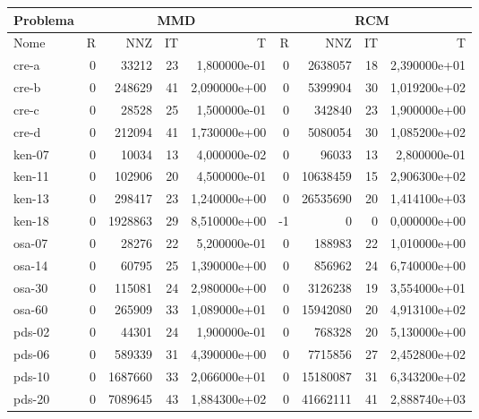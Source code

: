 \begin{tabular}{|l|r|r|r|r|r|r|r|r|}
\hline
\multicolumn{1}{|c|}{Problema} & \multicolumn{4}{|c|}{MMD} &         \multicolumn{4}{|c|}{RCM} \\ \hline
Nome & R & NNZ & IT & T & R & NNZ & IT & T \\ \hline
cre-a & 0 & 33212 & 23 & 1,800000e-01 & 0 & 2638057 & 18 & 2,390000e+01 \\ \hline
cre-b & 0 & 248629 & 41 & 2,090000e+00 & 0 & 5399904 & 30 & 1,019200e+02 \\ \hline
cre-c & 0 & 28528 & 25 & 1,500000e-01 & 0 & 342840 & 23 & 1,900000e+00 \\ \hline
cre-d & 0 & 212094 & 41 & 1,730000e+00 & 0 & 5080054 & 30 & 1,085200e+02 \\ \hline
ken-07 & 0 & 10034 & 13 & 4,000000e-02 & 0 & 96033 & 13 & 2,800000e-01 \\ \hline
ken-11 & 0 & 102906 & 20 & 4,500000e-01 & 0 & 10638459 & 15 & 2,906300e+02 \\ \hline
ken-13 & 0 & 298417 & 23 & 1,240000e+00 & 0 & 26535690 & 20 & 1,414100e+03 \\ \hline
ken-18 & 0 & 1928863 & 29 & 8,510000e+00 & -1 & 0 & 0 & 0,000000e+00 \\ \hline
osa-07 & 0 & 28276 & 22 & 5,200000e-01 & 0 & 188983 & 22 & 1,010000e+00 \\ \hline
osa-14 & 0 & 60795 & 25 & 1,390000e+00 & 0 & 856962 & 24 & 6,740000e+00 \\ \hline
osa-30 & 0 & 115081 & 24 & 2,980000e+00 & 0 & 3126238 & 19 & 3,554000e+01 \\ \hline
osa-60 & 0 & 265909 & 33 & 1,089000e+01 & 0 & 15942080 & 20 & 4,913100e+02 \\ \hline
pds-02 & 0 & 44301 & 24 & 1,900000e-01 & 0 & 768328 & 20 & 5,130000e+00 \\ \hline
pds-06 & 0 & 589339 & 31 & 4,390000e+00 & 0 & 7715856 & 27 & 2,452800e+02 \\ \hline
pds-10 & 0 & 1687660 & 33 & 2,066000e+01 & 0 & 15180087 & 31 & 6,343200e+02 \\ \hline
pds-20 & 0 & 7089645 & 43 & 1,884300e+02 & 0 & 41662111 & 41 & 2,888740e+03 \\ \hline
\end{tabular}
